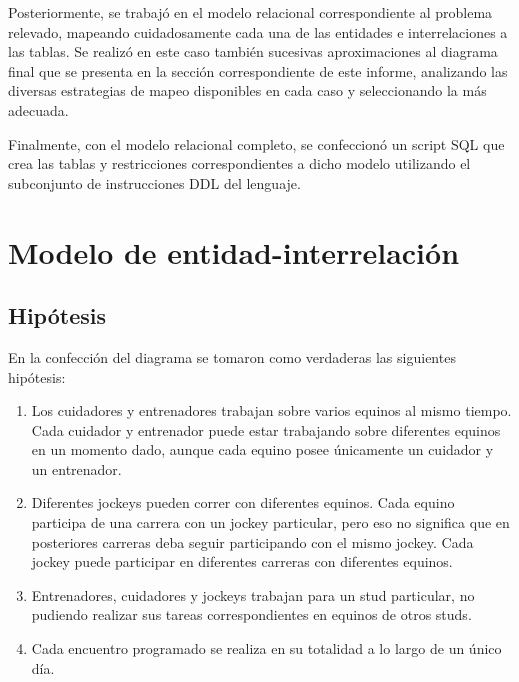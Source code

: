 \documentclass[a4paper,11pt]{article}
\begin{document}
Posteriormente, se trabajó en el modelo relacional correspondiente al problema
relevado, mapeando cuidadosamente cada una de las entidades e interrelaciones a
las tablas. Se realizó en este caso también sucesivas aproximaciones al
diagrama final que se presenta en la sección correspondiente de este informe,
analizando las diversas estrategias de mapeo disponibles en cada caso y
seleccionando la más adecuada.

Finalmente, con el modelo relacional completo, se confeccionó un script SQL que
crea las tablas y restricciones correspondientes a dicho modelo utilizando el
subconjunto de instrucciones DDL del lenguaje.

\section{Modelo de entidad-interrelación} \label{sec:der}

\subsection{Hipótesis}

En la confección del diagrama se tomaron como verdaderas las siguientes
hipótesis:

\begin{enumerate}

  \item Los cuidadores y entrenadores trabajan sobre varios equinos al mismo
    tiempo. Cada cuidador y entrenador puede estar trabajando sobre diferentes
    equinos en un momento dado, aunque cada equino posee únicamente un cuidador
    y un entrenador.

  \item Diferentes jockeys pueden correr con diferentes equinos. Cada equino
    participa de una carrera con un jockey particular, pero eso no significa
    que en posteriores carreras deba seguir participando con el mismo jockey.
    Cada jockey puede participar en diferentes carreras con diferentes equinos.

  \item Entrenadores, cuidadores y jockeys trabajan para un stud particular, no
    pudiendo realizar sus tareas correspondientes en equinos de otros studs.

  \item Cada encuentro programado se realiza en su totalidad a lo largo de un
    único día.

\end{enumerate}
\end{document}
